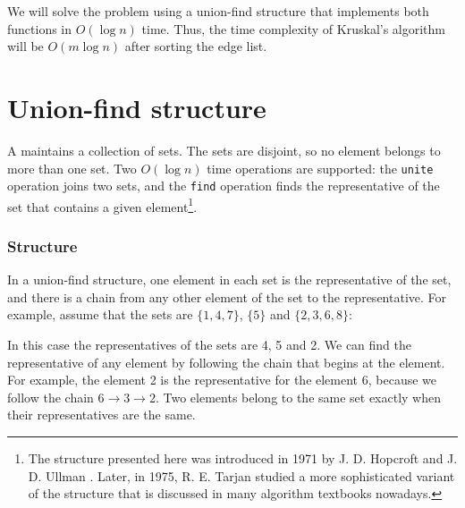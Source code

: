 We will solve the problem using a union-find structure
that implements both functions in $O(\log n)$ time.
Thus, the time complexity of Kruskal's algorithm
will be $O(m \log n)$ after sorting the edge list.

\section{Union-find structure}


A  maintains
a collection of sets.
The sets are disjoint, so no element
belongs to more than one set.
Two $O(\log n)$ time operations are supported:
the \texttt{unite} operation joins two sets,
and the \texttt{find} operation finds the representative
of the set that contains a given element\footnote{The structure presented here
was introduced in 1971 by J. D. Hopcroft and J. D. Ullman \cite{hop71}.
Later, in 1975, R. E. Tarjan studied a more sophisticated variant
of the structure \cite{tar75} that is discussed in many algorithm
textbooks nowadays.}.

\subsubsection{Structure}

In a union-find structure, one element in each set
is the representative of the set,
and there is a chain from any other element of the
set to the representative.
For example, assume that the sets are
$\{1,4,7\}$, $\{5\}$ and $\{2,3,6,8\}$:
\begin{center}
\end{center}
In this case the representatives
of the sets are 4, 5 and 2.
We can find the representative of any element
by following the chain that begins at the element.
For example, the element 2 is the representative
for the element 6, because
we follow the chain $6 \rightarrow 3 \rightarrow 2$.
Two elements belong to the same set exactly when
their representatives are the same.

